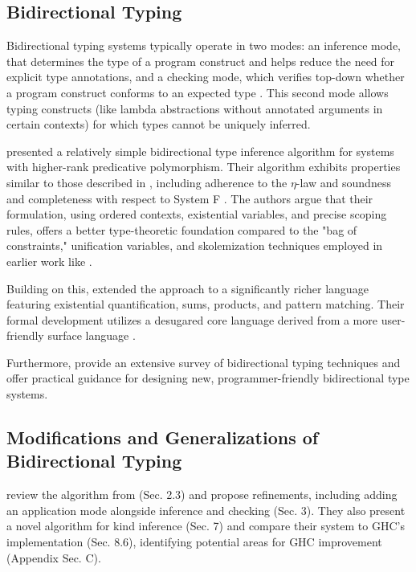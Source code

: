 \subsection{Bidirectional Typing}

Bidirectional typing systems typically operate in two modes: an inference mode, that determines the type of a program construct and helps reduce the need for explicit type annotations, and a checking mode, which verifies top-down whether a program construct conforms to an expected type \cite{dunfield-bidirectional-2020}. This second mode allows typing constructs (like lambda abstractions without annotated arguments in certain contexts) for which types cannot be uniquely inferred.

\cite{dunfield-complete-2013} presented a relatively simple bidirectional type inference algorithm for systems with higher-rank predicative polymorphism. Their algorithm exhibits properties similar \cite[Fig. 15]{dunfield-complete-2013} to those described in \cite[Sec.~6]{jones-practical-2007}, including adherence to the $\eta$-law \cite[Ch.~4]{selinger-lecture-2013} and soundness and completeness with respect to System F \cite[Ch.~8]{selinger-lecture-2013}. The authors argue that their formulation, using ordered contexts, existential variables, and precise scoping rules, offers a better type-theoretic foundation compared to the "bag of constraints," unification variables, and skolemization techniques employed in earlier work like \cite{jones-practical-2007}.

Building on this, \citeauthor{dunfield-sound-2019} \cite{dunfield-sound-2019} extended the approach to a significantly richer language featuring existential quantification, sums, products, and pattern matching. Their formal development utilizes a desugared core language \cite[Fig. 11]{dunfield-sound-2019} derived from a more user-friendly surface language \cite[Fig. 1]{dunfield-sound-2019}.

Furthermore, \cite{dunfield-bidirectional-2020} provide an extensive survey of bidirectional typing techniques and offer practical guidance for designing new, programmer-friendly bidirectional type systems.

\subsection{Modifications and Generalizations of Bidirectional Typing}

\cite{xie-higher-rank} review the algorithm from \cite{dunfield-complete-2013} (Sec. 2.3) and propose refinements, including adding an application mode alongside inference and checking (Sec. 3). They also present a novel algorithm for kind inference (Sec. 7) and compare their system to GHC's implementation (Sec. 8.6), identifying potential areas for GHC improvement (Appendix Sec. C).


